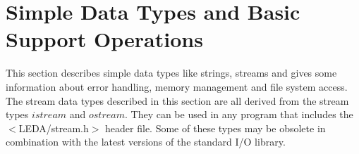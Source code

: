 
\chapter{Simple Data Types and Basic Support Operations} 
\label{Simple Data Types}\label{Miscellaneous}

This section describes simple data types like strings, streams and gives some
information about error handling, memory management and file system access.
The stream data types described in this section are all derived from
the \CC{} stream types $istream$ and $ostream$. They can be used in any program
that includes the $<$LEDA/stream.h$>$ header file. Some of these types may be
obsolete in combination with the latest versions of the standard \CC{} I/O
library. 


\newpage

\newpage

\newpage

\newpage

\newpage

\newpage

\newpage

\newpage

\newpage
%

\newpage

\newpage

\newpage

\newpage

\newpage

